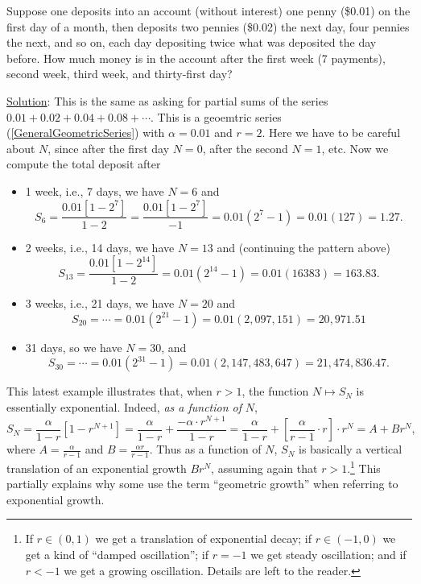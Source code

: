 \eex

\bex Suppose one deposits into an account (without interest)
     one penny (\$0.01) on the first
     day of a month, then deposits two pennies (\$0.02)
     the next day, four pennies the next, and so on,
     each day depositing twice what was deposited the
     day before.  How much money is in the account
     after the first week (7 payments), 
     second week, third week, and thirty-first
     day?

\underline{Solution}: This is the same as asking for
     partial sums of the series $0.01+0.02+0.04+0.08+\cdots$.
     This is a geoemtric series (\ref{GeneralGeometricSeries}) with
     $\alpha=0.01$ and $r=2$.  Here we have to be careful
     about $N$, since after the first day $N=0$, after the 
     second $N=1$, etc.  Now we compute the total deposit after
     \begin{itemize}
     \item 1 week, i.e., 7 days, we have $N=6$ and
        $$S_6=\frac{0.01\left[1-2^7\right]}{1-2}
             =\frac{0.01\left[1-2^7\right]}{-1}
             =0.01\left(2^7-1\right)=0.01(127)=1.27.$$
     \item 2 weeks, i.e., 14 days, we have $N=13$ and (continuing the
           pattern above)
         $$S_{13}=\frac{0.01\left[1-2^{14}\right]}{1-2}
                 =0.01\left(2^{14}-1\right)=0.01(16383)=163.83.$$
     \item 3 weeks, i.e., 21 days, we have $N=20$ and
         $$S_{20}=\cdots=0.01\left(2^{21}-1\right)=0.01(2,097,151)
                 =20,971.51$$
     \item 31 days, so we have $N=30$, and
         $$S_{30}=\cdots=0.01\left(2^{31}-1\right)
                 =0.01(2,147,483,647)=21,474,836.47.$$
      \end{itemize}
\eex
This latest example illustrates that, when $r>1$, the
function $N\mapsto S_N$ is essentially exponential.
Indeed, {\it as a function of} $N$, 
$$S_N=\frac{\alpha}{1-r}\left[1-r^{N+1}\right]
=\frac{\alpha}{1-r}+\frac{-\alpha\cdot r^{N+1}}{1-r}     
=\frac{\alpha}{1-r}+\left[\frac{\alpha}{r-1}\cdot r\right]
\cdot r^{N}=A+Br^N,$$
where $A=\frac{\alpha}{r-1}$ and $B=\frac{\alpha r}{r-1}$.
Thus as a function of $N$, $S_N$ is basically
a vertical translation of an 
exponential growth $Br^N$, assuming again that $r>1$.\footnote{%
If $r\in(0,1)$ we get a translation
of exponential decay; if $r\in(-1,0)$ we get a kind of
``damped  oscillation''; if $r=-1$ we get steady oscillation;
and if $r<-1$ we get a growing oscillation.  Details are left to
the reader.
}
This partially explains why some use the term ``geometric growth''
when referring to exponential growth.

